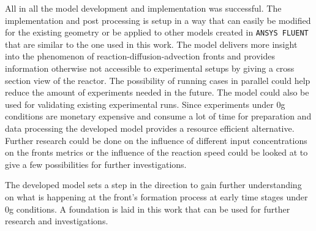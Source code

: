 \documentclass[../thesis.tex]{subfiles}
\begin{document}
All in all the model development and implementation was successful. The implementation and post processing is setup in a way that can easily be modified for the existing geometry or be applied to other models created in \texttt{ANSYS FLUENT} that are similar to the one used in this work. The model delivers more insight into the phenomenon of reaction-diffusion-advection fronts and provides information otherwise not accessible to experimental setups by giving a cross section view of the reactor. The possibility of running cases in parallel could help reduce the amount of experiments needed in the future. The model could also be used for validating existing experimental runs. Since experiments under 0g conditions are monetary expensive and consume a lot of time for preparation and data processing the developed model provides a resource efficient alternative. Further research could be done on the influence of different input concentrations on the fronts metrics or the influence of the reaction speed could be looked at to give a few possibilities for further investigations. 

The developed model sets a step in the direction to gain further understanding on what is happening at the front's formation process at early time stages under 0g conditions. A foundation is laid in this work that can be used for further research and investigations.
\end{document}
